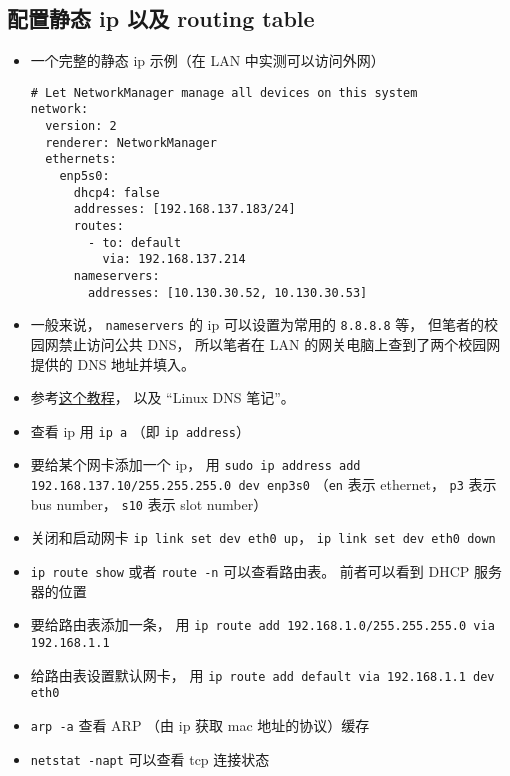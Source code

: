 \subsection{配置静态 ip 以及 routing table}
\begin{itemize}
\item 一个完整的静态 ip 示例（在 LAN 中实测可以访问外网）
\begin{lstlisting}[language=none, caption=01-network-manager-all.yaml]
# Let NetworkManager manage all devices on this system
network:
  version: 2
  renderer: NetworkManager
  ethernets:
    enp5s0:
      dhcp4: false
      addresses: [192.168.137.183/24]
      routes:
        - to: default
          via: 192.168.137.214
      nameservers:
        addresses: [10.130.30.52, 10.130.30.53]
\end{lstlisting}
\item 一般来说， \verb|nameservers| 的 ip 可以设置为常用的 \verb|8.8.8.8| 等， 但笔者的校园网禁止访问公共 DNS， 所以笔者在 LAN 的网关电脑上查到了两个校园网提供的 DNS 地址并填入。
\item 参考\href{https://linuxiac.com/how-to-set-static-ip-address-and-modifying-routing-table-on-linux/}{这个教程}， 以及 “Linux DNS 笔记”。
\item 查看 ip 用 \verb|ip a| （即 \verb|ip address|）
\item 要给某个网卡添加一个 ip， 用 \verb|sudo ip address add 192.168.137.10/255.255.255.0 dev enp3s0| （\verb|en| 表示 ethernet， \verb|p3| 表示 bus number， \verb|s10| 表示 slot number）
\item 关闭和启动网卡 \verb|ip link set dev eth0 up|， \verb|ip link set dev eth0 down|
\item \verb|ip route show| 或者 \verb|route -n| 可以查看路由表。 前者可以看到 DHCP 服务器的位置
\item 要给路由表添加一条， 用 \verb|ip route add 192.168.1.0/255.255.255.0 via 192.168.1.1|
\item 给路由表设置默认网卡， 用 \verb|ip route add default via 192.168.1.1 dev eth0|
\item \verb|arp -a| 查看 ARP （由 ip 获取 mac 地址的协议）缓存
\item \verb|netstat -napt| 可以查看 tcp 连接状态
\end{itemize}


